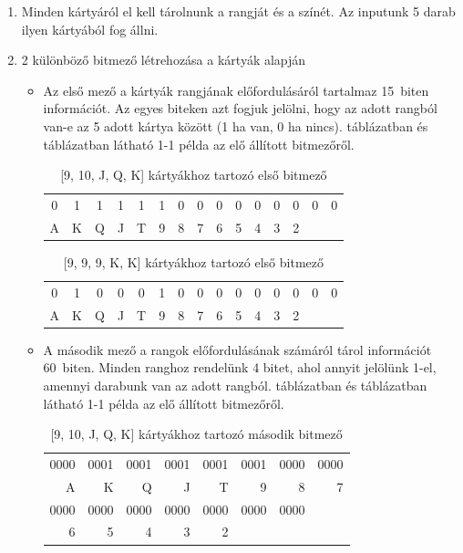\documentclass[]{thesis-ekf}
\theoremstyle{definition}
\theoremstyle{remark}
\begin{document}
\begin{enumerate}
	\item Minden kártyáról el kell tárolnunk a rangját és a színét. Az inputunk 5 darab ilyen kártyából fog állni.
	\item 2 különböző bitmező létrehozása a kártyák alapján
	\begin{itemize}
		\item Az első mező a kártyák rangjának előfordulásáról tartalmaz 15~biten információt. Az egyes biteken azt fogjuk jelölni, hogy az adott rangból van-e az 5 adott kártya között (1 ha van, 0 ha nincs).  táblázatban és  táblázatban látható 1-1 példa az elő állított bitmezőről.
		
		\begin{table}[ht!]
			\centering
			\footnotesize
			\begin{tabular}{*{15}{c}}
				0 & 1 & 1 & 1 & 1 & 1 & 0 & 0 & 0 & 0 & 0 & 0 & 0 & 0 & 0\\
				A & K & Q & J & T & 9 & 8 & 7 & 6 & 5 & 4 & 3 & 2
			\end{tabular}
			\caption{[9, 10, J, Q, K] kártyákhoz tartozó első bitmező}
			\label{tab-bitfieldvalues1}
		\end{table}
		
		\begin{table}[ht!]
			\centering
			\footnotesize
			\begin{tabular}{*{15}{c}}
				0 & 1 & 0 & 0 & 0 & 1 & 0 & 0 & 0 & 0 & 0 & 0 & 0 & 0 & 0\\
				A & K & Q & J & T & 9 & 8 & 7 & 6 & 5 & 4 & 3 & 2
			\end{tabular}
			\caption{[9, 9, 9, K, K] kártyákhoz tartozó első bitmező}
			\label{tab-bitfieldvalues2}
		\end{table}
		
		\item A második mező a rangok előfordulásának számáról tárol információt 60~biten. Minden ranghoz rendelünk 4 bitet, ahol annyit jelölünk 1-el, amennyi darabunk van az adott rangból.  táblázatban és  táblázatban látható 1-1 példa az elő állított bitmezőről.
		
		\begin{table}[ht!]
			\centering
			\footnotesize
			\begin{tabular}{*{8}{r}}
				0000 & 0001 & 0001 & 0001 & 0001 & 0001 & 0000 & 0000 \\
				A & K & Q & J & T & 9 & 8 & 7 \\
				0000 & 0000 & 0000 & 0000 & 0000 & 0000 & 0000 \\
				6 & 5 & 4 & 3 & 2 &   &   &   
			\end{tabular}
			\caption{[9, 10, J, Q, K] kártyákhoz tartozó második bitmező}
			\label{tab-bitfieldcounts1}
		\end{table}
		

\end{itemize}
\end{enumerate}
\end{document}
